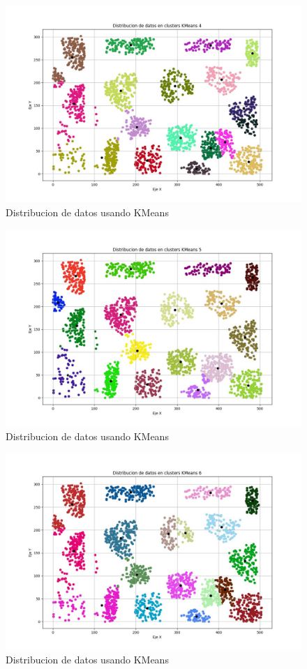 \documentclass[conference]{IEEEtran}
\begin{document}
\begin{figure}[htbp]
    \centering
    \includegraphics[width=1\linewidth]{figures/kmeans4.jpeg} %
    \caption{Distribucion de datos usando KMeans}
    \label{fig:kmeans4}
\end{figure}
\begin{figure}[htbp]
    \centering
    \includegraphics[width=1\linewidth]{figures/kmeans5.jpeg} %
    \caption{Distribucion de datos usando KMeans}
    \label{fig:kmeans5}
\end{figure}
\begin{figure}[htbp]
    \centering
    \includegraphics[width=1\linewidth]{figures/kmeans6.jpeg} %
    \caption{Distribucion de datos usando KMeans}
    \label{fig:kmeans6}
\end{figure}
\end{document}
